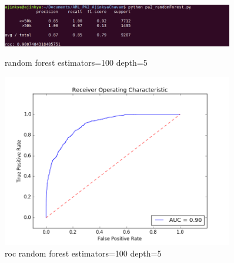 \documentclass{article}
\begin{document}
\begin{figure}
    \centering
    \begin{minipage}{0.45\textwidth}
        \centering
        \includegraphics[width=0.9\textwidth]{random_100_5.png} %
        \caption{random forest estimators=100 depth=5}
    \end{minipage}\hfill
    \begin{minipage}{0.45\textwidth}
        \centering
        \includegraphics[width=0.9\textwidth]{roc_random_100_5.png} %
        \caption{roc random forest estimators=100 depth=5}
    \end{minipage}
\end{figure}
\end{document}
